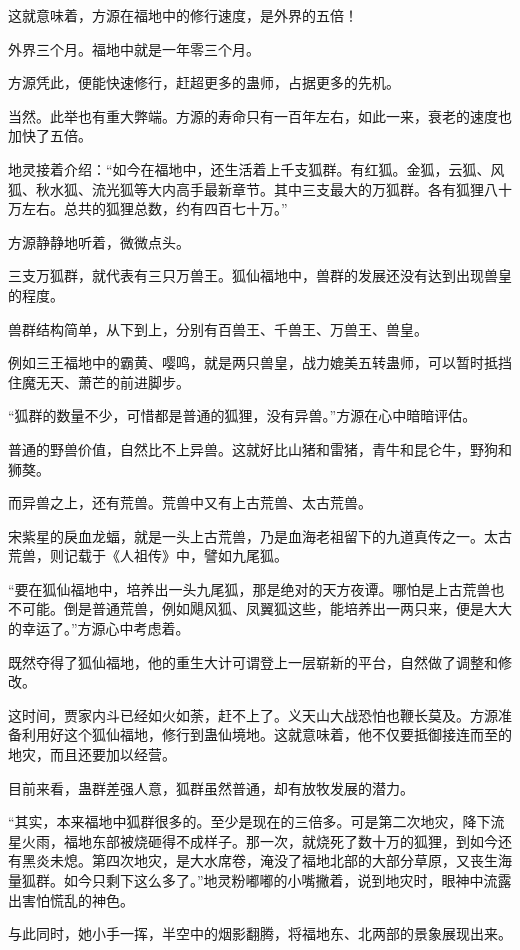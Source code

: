 \begin{this_body}
这就意味着，方源在福地中的修行速度，是外界的五倍！

外界三个月。福地中就是一年零三个月。

方源凭此，便能快速修行，赶超更多的蛊师，占据更多的先机。

当然。此举也有重大弊端。方源的寿命只有一百年左右，如此一来，衰老的速度也加快了五倍。

地灵接着介绍：“如今在福地中，还生活着上千支狐群。有红狐。金狐，云狐、风狐、秋水狐、流光狐等大内高手最新章节。其中三支最大的万狐群。各有狐狸八十万左右。总共的狐狸总数，约有四百七十万。”

方源静静地听着，微微点头。

三支万狐群，就代表有三只万兽王。狐仙福地中，兽群的发展还没有达到出现兽皇的程度。

兽群结构简单，从下到上，分别有百兽王、千兽王、万兽王、兽皇。

例如三王福地中的霸黄、嘤鸣，就是两只兽皇，战力媲美五转蛊师，可以暂时抵挡住魔无天、萧芒的前进脚步。

“狐群的数量不少，可惜都是普通的狐狸，没有异兽。”方源在心中暗暗评估。

普通的野兽价值，自然比不上异兽。这就好比山猪和雷猪，青牛和昆仑牛，野狗和狮獒。

而异兽之上，还有荒兽。荒兽中又有上古荒兽、太古荒兽。

宋紫星的戾血龙蝠，就是一头上古荒兽，乃是血海老祖留下的九道真传之一。太古荒兽，则记载于《人祖传》中，譬如九尾狐。

“要在狐仙福地中，培养出一头九尾狐，那是绝对的天方夜谭。哪怕是上古荒兽也不可能。倒是普通荒兽，例如飓风狐、凤翼狐这些，能培养出一两只来，便是大大的幸运了。”方源心中考虑着。

既然夺得了狐仙福地，他的重生大计可谓登上一层崭新的平台，自然做了调整和修改。

这时间，贾家内斗已经如火如荼，赶不上了。义天山大战恐怕也鞭长莫及。方源准备利用好这个狐仙福地，修行到蛊仙境地。这就意味着，他不仅要抵御接连而至的地灾，而且还要加以经营。

目前来看，蛊群差强人意，狐群虽然普通，却有放牧发展的潜力。

“其实，本来福地中狐群很多的。至少是现在的三倍多。可是第二次地灾，降下流星火雨，福地东部被烧砸得不成样子。那一次，就烧死了数十万的狐狸，到如今还有黑炎未熄。第四次地灾，是大水席卷，淹没了福地北部的大部分草原，又丧生海量狐群。如今只剩下这么多了。”地灵粉嘟嘟的小嘴撇着，说到地灾时，眼神中流露出害怕慌乱的神色。

与此同时，她小手一挥，半空中的烟影翻腾，将福地东、北两部的景象展现出来。


\end{this_body}
